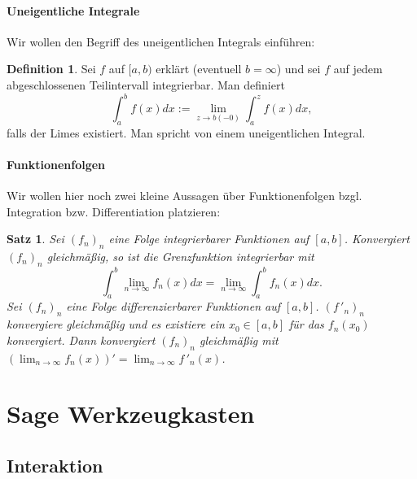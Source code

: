 \documentclass[fontsize=12pt,paper=a4,twoside,bibtotoc,idxtotoc,
liststotoc,pagesize,BCOR1.2cm,DIV15,chapterprefix,pagesize=pdftex]{scrbook}
\theoremstyle{plain}
\newtheorem{sz}[equation]{Satz}
\theoremstyle{definition}
\newtheorem{df}[equation]{Definition}
\theoremstyle{remark}
\begin{document}
\subsubsection{Uneigentliche Integrale}
Wir wollen den Begriff des uneigentlichen Integrals einführen:
\begin{df}
Sei $f$ auf $[a,b)$ erklärt (eventuell $b=\infty$) und sei $f$ auf jedem
abgeschlossenen Teilintervall integrierbar. Man definiert
\[  \int_a^b f(x)dx := \lim_{z \rightarrow b (-0)} \int_a^z f(x)dx,\]
falls der Limes existiert. Man spricht von einem 
uneigentlichen Integral.
\end{df}
\subsubsection{Funktionenfolgen}
Wir wollen hier noch zwei kleine Aussagen über Funktionenfolgen bzgl. Integration bzw. Differentiation platzieren:
\begin{sz}
Sei $(f_n)_n$ eine Folge integrierbarer Funktionen auf
$[a,b]$. Konvergiert $(f_n)_n$ gleichmäßig, so ist die Grenzfunktion
integrierbar mit
\[ \int_a^b \lim_{n \rightarrow \infty} f_n(x) dx = \lim_{n
\rightarrow \infty} \int_a^b f_n(x) dx .\]
 Sei $(f_n)_n$ eine Folge differenzierbarer Funktionen auf
$[a,b]$. $(f\,'_n)_n$ konvergiere gleichmäßig und es existiere ein $x_0
\in [a,b]$ für das $f_n(x_0)$ konvergiert. Dann konvergiert $(f_n)_n$
gleichmäßig mit $( \lim_{n \rightarrow \infty} f_n(x))' = \lim_{n
\rightarrow \infty} f\,'_n(x)$.  
\end{sz}

\chapter{Sage Werkzeugkasten}
\section{Interaktion}
\end{document}
